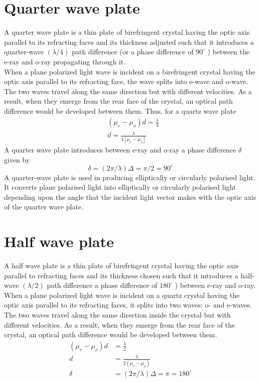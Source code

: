 \section{Quarter wave plate}
A quarter wave plate is a thin plate of birefringent crystal having the optic axis parallel to its refracting faces and its thickness adjusted such that it introduces a quarter-wave $(\lambda / 4)$ path difference (or a phase difference of $90^{\circ}$ ) between the e-ray and o-ray propagating through it.\\
When a plane polarized light wave is incident on a birefringent crystal having the optic axis parallel to its refracting face, the wave splits into e-wave and o-wave. The two waves travel along the same direction but with different velocities. As a result, when they emerge from the rear face of the crystal, an optical path difference would be developed between them. Thus, for a quartz wave plate\\
$$
\begin{aligned}
&\left(\mu_{e}-\mu_{o}\right) d=\frac{\lambda}{4} \\
&d=\frac{\lambda}{4\left[\mu_{e}-\mu_{o}\right]}
\end{aligned}
$$
A quarter wave plate introduces between e-ray and o-ray a phase difference $\delta$ given by
$$
\delta=(2 \pi / \lambda) \Delta=\pi / 2=90^{\circ}
$$
A quarter-wave plate is used in producing elliptically or circularly polarised light. It converts plane polarised light into elliptically or circularly polarised light depending upon the angle that the incident light vector makes with the optic axis of the quarter wave plate.
\section{Half wave plate}
A half wave plate is a thin plate of birefringent crystal having the optic axis parallel to refracting faces and its thickness chosen such that it introduces a half-wave $(\lambda / 2)$ path difference a phase difference of $180^{\circ}$ ) between e-ray and o-ray.\\
When a plane polarized light wave is incident on a quartz crystal having the optic axis parallel to its refracting faces, it splits into two waves: o- and e-waves. The two waves travel along the same direction inside the crystal but with different velocities. As a result, when they emerge from the rear face of the crystal, an optical path difference would be developed between them.\\
$$\begin{aligned}
	\left(\mu_{e}-\mu_{o}\right) d&=\frac{\lambda}{2} \\
	d&=\frac{\lambda}{2\left(\mu_{e}-\mu_{o}\right)}\\
	\delta&=(2 \pi / \lambda) \Delta=\pi=180^{\circ}
\end{aligned}$$
